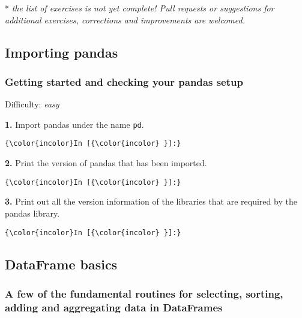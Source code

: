 \documentclass[11pt]{article}
\begin{document}
* \emph{the list of exercises is not yet complete! Pull requests or
suggestions for additional exercises, corrections and improvements are
welcomed.}

    \subsection{Importing pandas}\label{importing-pandas}

\subsubsection{Getting started and checking your pandas
setup}\label{getting-started-and-checking-your-pandas-setup}

Difficulty: \emph{easy}

\textbf{1.} Import pandas under the name \texttt{pd}.

    \begin{Verbatim}[commandchars=\\\{\}]
{\color{incolor}In [{\color{incolor} }]:} 
\end{Verbatim}


    \textbf{2.} Print the version of pandas that has been imported.

    \begin{Verbatim}[commandchars=\\\{\}]
{\color{incolor}In [{\color{incolor} }]:} 
\end{Verbatim}


    \textbf{3.} Print out all the version information of the libraries that
are required by the pandas library.

    \begin{Verbatim}[commandchars=\\\{\}]
{\color{incolor}In [{\color{incolor} }]:} 
\end{Verbatim}


    \subsection{DataFrame basics}\label{dataframe-basics}

\subsubsection{A few of the fundamental routines for selecting, sorting,
adding and aggregating data in
DataFrames}\label{a-few-of-the-fundamental-routines-for-selecting-sorting-adding-and-aggregating-data-in-dataframes}
\end{document}
